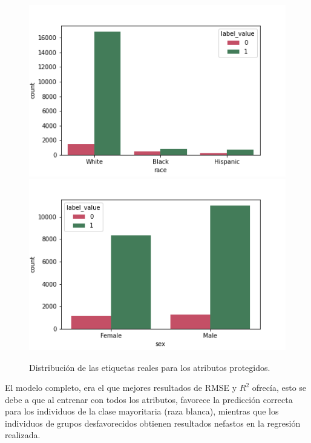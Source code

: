 \documentclass[oneside,openright,titlepage,numbers=noenddot,openany,headinclude,footinclude=true,
cleardoublepage=empty,abstractoff,BCOR=5mm,paper=a4,fontsize=12pt,main=spanish]{scrreprt}
\begin{document}
\begin{figure}[h]
      \includegraphics[width=\linewidth]{images/label_race_law_2.png}
    \endminipage\hfill
      \includegraphics[width=\linewidth]{images/label_sex_law_2.png}
    \endminipage
     \caption{Distribución de las etiquetas reales para los atributos protegidos.}
     \label{fig:labelracesex3}
\end{figure}

\clearpage

El modelo completo, era el que mejores resultados de RMSE y $R^2$ ofrecía, esto se debe a que al entrenar con todos los atributos, favorece la predicción correcta para los individuos de la clase mayoritaria (raza blanca), mientras que los individuos de grupos desfavorecidos obtienen resultados nefastos en la regresión realizada.
\end{document}
